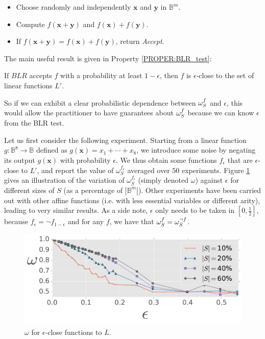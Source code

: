 \begin{itemize}
\item Choose randomly and independently $\mathbf{x}$ and $\mathbf{y}$ in
  $\mathbb{B}^m$.
\item Compute $f(\mathbf{x}+\mathbf{y})$ and $f(\mathbf{x}) + f(\mathbf{y})$.
\item If $f(\mathbf{x}+\mathbf{y}) = f(\mathbf{x}) + f(\mathbf{y})$, return
  \textit{Accept}.
\end{itemize}

The main useful result is given in Property \ref{PROPER:BLR_test}:
\begin{property}
  \label{PROPER:BLR_test}
  If $BLR$ accepts $f$ with a probability at least $1-\epsilon$, then $f$ is
  $\epsilon$-close to the set of linear functions $L'$.
\end{property}

So if we can exhibit a clear probabilistic dependence between $\omega_{S}^{f}$
and $\epsilon$, this would allow the practitioner to have guarantees about
$\omega_{S}^{f}$ because we can know $\epsilon$ from the BLR test.

Let us first consider the following experiment. Starting from a linear function $g
\colon \mathbb{B}^8 \to \mathbb{B}$ defined as  $g(\mathbf{x}) = x_1 + \cdots +
x_8$, we introduce some noise by negating its output $g(\mathbf{x})$ with
probability $\epsilon$. We thus obtain some functions $f_{\epsilon}$ that are
$\epsilon$-close to $L'$, and report the value of $\omega_S^{f_\epsilon}$ averaged over $50$
experiments.  Figure \ref{omega_vs_eps} gives an
illustration of the variation of $\omega_S^{f_\epsilon}$ (simply denoted
$\omega$) against  $\epsilon$ for different
sizes of $S$ (as a percentage of $|\mathbb{B}^m|$).  Other experiments have
been carried out with other affine functions (i.e.  with less essential
variables or different arity), leading to very similar results. As a side note,
$\epsilon$ only needs to be taken in $[0, \frac{1}{2}]$, because $f_\epsilon =
\neg f_{1 - \epsilon}$ and for any $f$, we have that $\omega_{S}^{f} = \omega_S^{\neg
f}$.

\begin{figure}
\begin{center}
\includegraphics[scale=0.6]{figures/omega_vs_eps_dim8_nexp50_std_nEss8.pdf}
  \caption{$\omega$ for $\epsilon$-close functions to $L$.}
\label{omega_vs_eps}
\end{center}
\end{figure}

